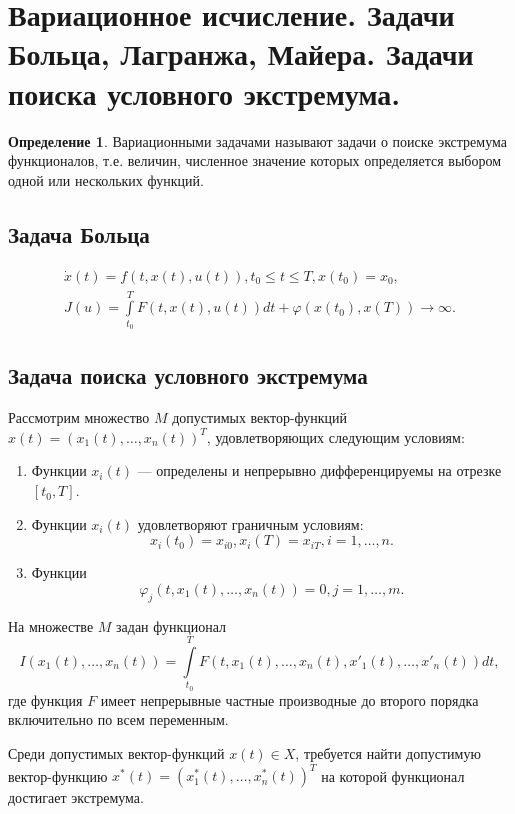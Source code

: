 \documentclass[12pt]{report}
\theoremstyle{definition}
\newtheorem{definition}[theorem]{Определение}
\begin{document}
\section
{
  Вариационное исчисление. Задачи Больца, Лагранжа, Майера.
  Задачи поиска условного экстремума.
}

\begin{definition}
  Вариационными задачами называют задачи о поиске экстремума функционалов,
  т.е. величин, численное значение которых определяется выбором одной или
  нескольких функций.
\end{definition}

\subsection
{
  Задача Больца
}

\begin{gather*}
\dot{x} (t) = f(t, x(t), u(t)), t_0 \le t \le T, x(t_0) = x_0, \\
J(u) = \int\limits_{t_0}^T F(t, x(t), u(t)) dt + \varphi(x(t_0), x(T)) \rightarrow \infty.
\end{gather*}


\subsection{Задача поиска условного экстремума}

Рассмотрим множество $M$ допустимых вектор-функций $x(t) = (x_1(t), \dots, x_n(t))^T$,
удовлетворяющих следующим условиям:
\begin{enumerate}
\item Функции $x_i(t)$ --- определены и непрерывно дифференцируемы
  на отрезке $[t_0, T]$.
\item Функции $x_i(t)$ удовлетворяют граничным условиям:
$$
  x_i(t_0) = x_{i0}, x_i(T) = x_{iT}, i = 1, \dots, n.
$$
\item Функции 
$$
\varphi_j(t, x_1(t), \dots, x_n(t)) = 0, j = 1, \dots, m.
$$
\end{enumerate}

На множестве $M$ задан функционал
$$
I(x_1(t), \dots, x_n(t)) = 
\int\limits_{t_0}^T F(t, x_1(t), \dots, x_n(t), x'_1(t), \dots, x'_n(t)) dt,
$$
где функция $F$ имеет непрерывные частные производные до второго порядка включительно по
всем переменным.

Среди допустимых вектор-функций $x(t) \in X$, требуется найти допустимую вектор-функцию
$x^*(t) = (x^*_1(t), \dots, x^*_n(t))^T$ на которой функционал достигает экстремума.
\end{document}
